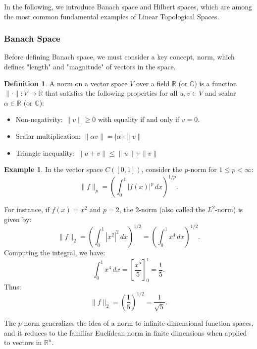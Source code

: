 \documentclass[12pt, reqno]{amsart}
\theoremstyle{definition}
\newtheorem{definition}[theorem]{Definition}
\newtheorem{example}[theorem]{Example}
\numberwithin{equation}{section}
\newcommand{\dR}{{\mathbb R}}
\begin{document}
In the following, we introduce Banach space and Hilbert spaces, which are among the most common fundamental examples of Linear Topological Spaces.
\subsubsection{Banach Space}
Before defining Banach space, we must consider a key concept, norm, which defines "length" and "magnitude" of vectors in the space.

\begin{definition}
        A norm on a vector space $V$ over a field $\dR$ (or $\mathbb{C}$) is a function $\|\cdot\| : V \to \dR$ that satisfies the following properties for all $u, v \in V$ and scalar $\alpha \in \dR$ (or $\mathbb{C}$):

\begin{itemize}
    \item Non-negativity: $\|v\| \geq 0$ with equality if and only if $v = 0$.
    \item Scalar multiplication: $\|\alpha v\| = |\alpha| \cdot \|v\|$
    \item Triangle inequality: $\|u + v\| \leq \|u\| + \|v\|$
\end{itemize}
\end{definition}

\begin{example}
    In the vector space \( C([0, 1]) \), consider the \( p \)-norm for \( 1 \leq p < \infty \):
    $$
    \|f\|_p = \left( \int_0^1 |f(x)|^p \, dx \right)^{1/p}.
    $$

    For instance, if \( f(x) = x^2 \) and \( p = 2 \), the \( 2 \)-norm (also called the \( L^2 \)-norm) is given by:
    $$
    \|f\|_2 = \left( \int_0^1 |x^2|^2 \, dx \right)^{1/2} = \left( \int_0^1 x^4 \, dx \right)^{1/2}.
    $$
    Computing the integral, we have:
    $$
    \int_0^1 x^4 \, dx = \left[ \frac{x^5}{5} \right]_0^1 = \frac{1}{5}.
    $$
    Thus:
    $$
    \|f\|_2 = \left( \frac{1}{5} \right)^{1/2} = \frac{1}{\sqrt{5}}.
    $$

    The \( p \)-norm generalizes the idea of a norm to infinite-dimensional function spaces, and it reduces to the familiar Euclidean norm in finite dimensions when applied to vectors in \( \dR^n \).
\end{example}
\end{document}
